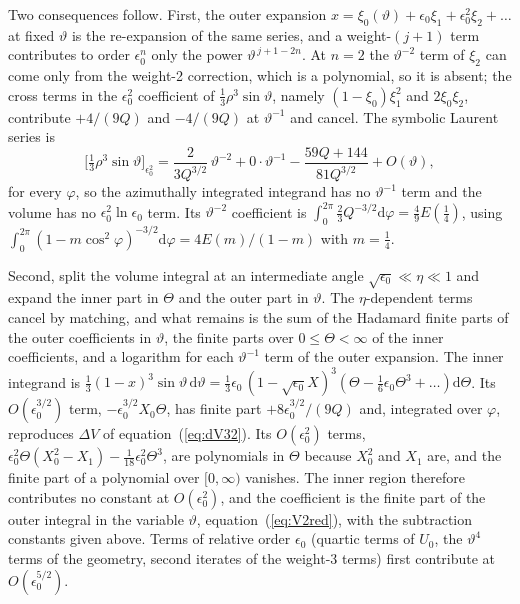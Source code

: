 \documentclass[twocolumn]{aastex702}
\newcommand{\dd}{\mathrm{d}}
\begin{document}
Two consequences follow. First, the outer expansion $x=\xi_0(\vartheta)+\epsilon_0\xi_1+\epsilon_0^2\xi_2+\ldots$ at fixed $\vartheta$ is the re-expansion of the same series, and a weight-$(j+1)$ term contributes to order $\epsilon_0^n$ only the power $\vartheta^{\,j+1-2n}$. At $n=2$ the $\vartheta^{-2}$ term of $\xi_2$ can come only from the weight-2 correction, which is a polynomial, so it is absent; the cross terms in the $\epsilon_0^2$ coefficient of $\tfrac13\rho^3\sin\vartheta$, namely $(1-\xi_0)\xi_1^2$ and $2\xi_0\xi_2$, contribute $+4/(9Q)$ and $-4/(9Q)$ at $\vartheta^{-1}$ and cancel. The symbolic Laurent series is
\begin{equation}
\big[\tfrac13\rho^3\sin\vartheta\big]_{\epsilon_0^2}=\frac{2}{3Q^{3/2}}\,\vartheta^{-2}+0\cdot\vartheta^{-1}-\frac{59Q+144}{81Q^{3/2}}+O(\vartheta),
\end{equation}
for every $\varphi$, so the azimuthally integrated integrand has no $\vartheta^{-1}$ term and the volume has no $\epsilon_0^2\ln\epsilon_0$ term. Its $\vartheta^{-2}$ coefficient is $\int_0^{2\pi}\tfrac23Q^{-3/2}\dd\varphi=\tfrac49E(\tfrac14)$, using $\int_0^{2\pi}(1-m\cos^2\varphi)^{-3/2}\dd\varphi=4E(m)/(1-m)$ with $m=\tfrac14$.

Second, split the volume integral at an intermediate angle $\sqrt{\epsilon_0}\ll\eta\ll1$ and expand the inner part in $\Theta$ and the outer part in $\vartheta$. The $\eta$-dependent terms cancel by matching, and what remains is the sum of the Hadamard finite parts of the outer coefficients in $\vartheta$, the finite parts over $0\le\Theta<\infty$ of the inner coefficients, and a logarithm for each $\vartheta^{-1}$ term of the outer expansion. The inner integrand is $\tfrac13(1-x)^3\sin\vartheta\,\dd\vartheta=\tfrac13\epsilon_0\,(1-\sqrt{\epsilon_0} X)^3(\Theta-\tfrac16\epsilon_0\Theta^3+\ldots)\dd\Theta$. Its $O(\epsilon_0^{3/2})$ term, $-\epsilon_0^{3/2}X_0\Theta$, has finite part $+8\epsilon_0^{3/2}/(9Q)$ and, integrated over $\varphi$, reproduces $\Delta V$ of equation~(\ref{eq:dV32}). Its $O(\epsilon_0^2)$ terms, $\epsilon_0^2\Theta(X_0^2-X_1)-\tfrac1{18}\epsilon_0^2\Theta^3$, are polynomials in $\Theta$ because $X_0^2$ and $X_1$ are, and the finite part of a polynomial over $[0,\infty)$ vanishes. The inner region therefore contributes no constant at $O(\epsilon_0^2)$, and the coefficient is the finite part of the outer integral in the variable $\vartheta$, equation~(\ref{eq:V2red}), with the subtraction constants given above. Terms of relative order $\epsilon_0$ (quartic terms of $U_0$, the $\vartheta^4$ terms of the geometry, second iterates of the weight-3 terms) first contribute at $O(\epsilon_0^{5/2})$.
\end{document}
